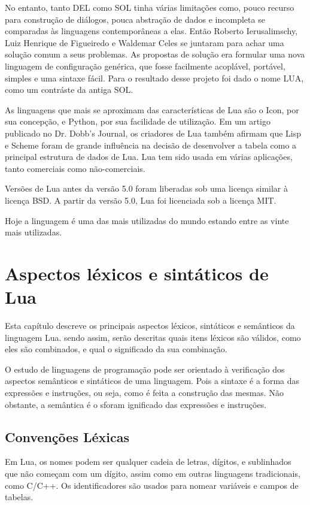 \documentclass[
12pt, %
openright, %
oneside, %
a4paper, %
english, %
brazil, %
]{abntex2}
\begin{document}
No entanto, tanto DEL como SOL tinha várias limitações como, pouco recurso para construção de diálogos, pouca abstração de dados e incompleta se comparadas às linguagens contemporâneas a elas. Então Roberto Ierusalimschy, Luiz Henrique de Figueiredo e Waldemar Celes se juntaram para achar uma solução comum a seus problemas. As propostas de solução era formular uma nova linguagem de configuração genérica, que fosse facilmente acoplável, portável, simples e uma sintaxe fácil. Para o resultado desse projeto foi dado o nome LUA, como um contráste da antiga SOL.

As linguagens que mais se aproximam das características de Lua são o Icon, por sua concepção, e Python, por sua facilidade de utilização. Em um artigo publicado no Dr. Dobb's Journal, os criadores de Lua também afirmam que Lisp e Scheme foram de grande influência na decisão de desenvolver a tabela como a principal estrutura de dados de Lua. Lua tem sido usada em várias aplicações, tanto comerciais como não-comerciais.

Versões de Lua antes da versão 5.0 foram liberadas sob uma licença similar à licença BSD. A partir da versão 5.0, Lua foi licenciada sob a licença MIT.

Hoje a linguagem é uma das mais utilizadas do mundo estando entre as vinte mais utilizadas.

\chapter{Aspectos léxicos e sintáticos de Lua}
Esta capítulo descreve os principais aspectos léxicos, sintáticos e semânticos da linguagem Lua. sendo assim, serão descritas quais itens léxicos são válidos, como eles são combinados, e qual o significado da sua combinação.

O estudo de linguagens de programação pode ser orientado à verificação dos aspectos semânticos e sintáticos de uma linguagem. Pois a sintaxe é a forma das expressões e instruções, ou seja, como é feita a construção das mesmas. Não obstante, a semântica é o sforam ignificado das expressões e instruções.

\section{Convenções Léxicas}
Em Lua, os nomes podem ser qualquer cadeia de letras, dígitos, e sublinhados que não começam com um dígito, assim como em outras linguagens tradicionais, como C/C++. Os identificadores são usados para nomear variáveis e campos de tabelas.
\end{document}
